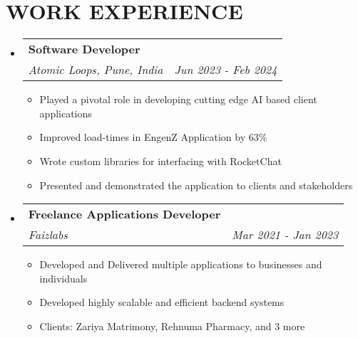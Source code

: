 \documentclass[letterpaper,11pt]{article}
\makeatletter
\newcommand{\resumeItem}[1]{
  \item\small{
    {#1 \vspace{-1pt}}
  }
}
\newcommand{\resumeSubheading}[4]{
  \vspace{-2pt}\item
    \begin{tabular*}{1.0\textwidth}[t]{l@{\extracolsep{\fill}}r}
      \textbf{\large#1} & \textbf{\small #2} \\
      \textit{\large#3} & \textit{\small #4} \\

    \end{tabular*}\vspace{-7pt}
}
\newcommand{\resumeSubHeadingListStart}{\begin{itemize}[leftmargin=0.0in, label={}]}
\newcommand{\resumeSubHeadingListEnd}{\end{itemize}}
\newcommand{\resumeItemListStart}{\begin{itemize}[leftmargin=0.1in]}
\newcommand{\resumeItemListEnd}{\end{itemize}\vspace{-5pt}}
\makeatother
\begin{document}
\section{\color{airforceblue}WORK EXPERIENCE}
  \resumeSubHeadingListStart

    \resumeSubheading
      {Software Developer}{}
      {Atomic Loops, Pune, India}{Jun 2023 - Feb 2024}
      \resumeItemListStart
            \resumeItem{\normalsize{Played a pivotal role in developing cutting edge AI based client applications}}
            \resumeItem{\normalsize{Improved load-times in EngenZ Application by 63\%}}
            \resumeItem{\normalsize{Wrote custom libraries for interfacing with RocketChat}}
            \resumeItem{\normalsize{Presented and demonstrated the application to clients and stakeholders}}
      \resumeItemListEnd

    \resumeSubheading
      {Freelance Applications Developer}{}
      {Faizlabs}{Mar 2021 - Jan 2023}
      \resumeItemListStart
            \resumeItem{\normalsize{Developed and Delivered multiple applications to businesses and individuals}}
            \resumeItem{\normalsize{Developed highly scalable and efficient backend systems}}
            \resumeItem{\normalsize{Clients: Zariya Matrimony, Rehnuma Pharmacy, and 3 more}}
      \resumeItemListEnd

  \resumeSubHeadingListEnd
\vspace{-12pt}


\end{document}
